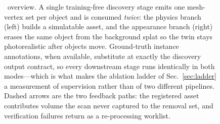 \begin{figure}[t]
\begin{tikzpicture}
\end{tikzpicture}
\caption{\name\ overview. A single training-free discovery stage emits one
mesh-vertex set per object and is consumed \emph{twice}: the physics branch
(left) builds a simulatable asset, and the appearance branch (right) erases
the same object from the background splat so the twin stays photorealistic
after objects move. Ground-truth instance annotations, when available,
substitute at exactly the discovery output contract, so every downstream stage
runs identically in both modes---which is what makes the ablation ladder of
Sec.~\ref{sec:ladder} a measurement of supervision rather than of two different
pipelines. Dashed arrows are the two feedback paths: the registered asset
contributes volume the scan never captured to the removal set, and verification
failures return as a re-processing worklist.}
\label{fig:pipeline}
\end{figure}
